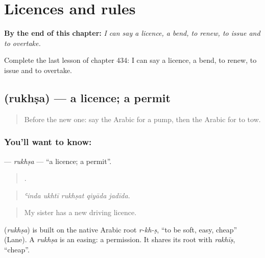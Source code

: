 
\chapter{Licences and rules}
\label{ch:ar-licences-and-rules}

\begin{chapteropening}
\textbf{By the end of this chapter:} \emph{I can say a licence, a bend, to renew, to issue and to overtake.}

Complete the last lesson of chapter 434: I can say a licence, a bend, to renew, to issue and to overtake.
\end{chapteropening}

\section[\texorpdfstring{\ar{رخصة} (rukhṣa)}{رخصة (rukhṣa)}]{ (rukhṣa) — a licence; a permit}

\label{lesson:AR-C434-rukhsa}



\begin{quote}
Before the new one: say the Arabic for a pump, then the Arabic for to tow.
\end{quote}

\subsection*{You'll want to know: }
\textbf{} — \emph{rukhṣa} — \textquotedblleft{}a licence; a permit\textquotedblright{}.

\begin{quote}
    .
\end{quote}

\begin{quote}
\emph{ʿinda ukhtī rukhṣat qiyāda jadīda.}
\end{quote}

\begin{quote}
My sister has a new driving licence.
\end{quote}

\begin{cousinweb}
\textbf{} (\emph{rukhṣa}) is built on the native Arabic root \emph{r-kh-ṣ}, \textquotedblleft{}to be soft, easy, cheap\textquotedblright{} (Lane). A \emph{rukhṣa} is an easing: a permission. It shares its root with \emph{rakhīṣ}, \textquotedblleft{}cheap\textquotedblright{}.
\end{cousinweb}

